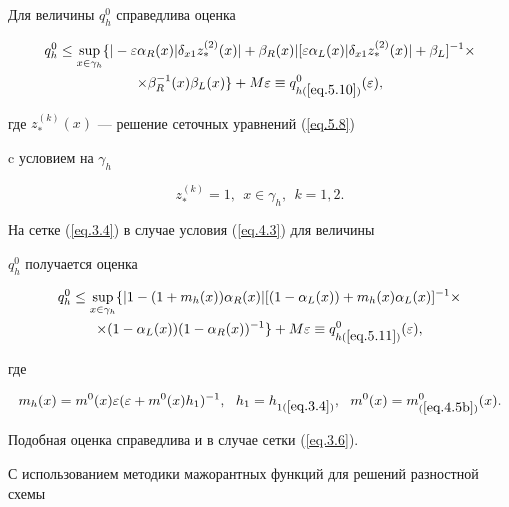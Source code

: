 Для величины $q^0_h$ справедлива оценка


\begin{multline} \label{eq.5.10}


q^0_h\leq \sup\limits_{x\in\gamma_h}


\{| -\eps \al_R(x) |\de_{x1} z_*^{(2)}(x)| +


\beta_R(x)|[ \eps \al_L(x)|\de_{x1} z_{*}^{(2)}(x)| +


\beta_L]^{-1}\times \\


\times\beta^{-1}_R(x)\beta_L(x)\} + M \eps \eq q^0_{h(\ref{eq.5.10})}(\eps),


\end{multline}


где $z^{(k)}_*(x)$ --- решение сеточных уравнений (\ref{eq.5.8})


c условием на $\gamma_h$


$$


z^{(k)}_* = 1, \ \ x\in \gamma_h, \ \ k=1,2.


$$


На сетке (\ref{eq.3.4}) в случае условия (\ref{eq.4.3}) для величины


$q^0_h$ получается оценка


\begin{multline} \label{eq.5.11}


q^0_h\leq \sup\limits_{x\in\gamma_h}


\{| 1-(1+m_h(x))\al_R(x)|


[ (1-\al_L(x))+ m_h(x)\al_L(x)]^{-1}\times\\


%


\times (1-\al_L(x))(1-\al_R(x))^{-1}\} +


M\eps \eq q^0_{h(\ref{eq.5.11})}(\eps), 


\end{multline}


где


$$


m_h(x)=m^0(x)\eps (\eps+m^0(x) h_1)^{-1}, \ \


h_1=h_{1(\ref{eq.3.4})}, \ \


m^0(x)=m^0_{(\ref{eq.4.5b})}(x).


$$


Подобная оценка справедлива и в случае сетки (\ref{eq.3.6}).





С использованием методики мажорантных функций для решений разностной схемы


